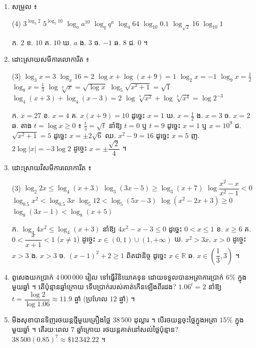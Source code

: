 \begin{enumerate}[1]
\begin{tasks}
    \task $10^{0.3010} = 2$
    \task $x^{-a} = y$
    \task $A = k^c$
  \end{tasks}
  \ans
  ក. $\log 10000 = 4$ \quad ខ. $\log_8 2 = \frac{1}{3}$ \quad គ. $\log_{16} 2 = \frac{1}{4}$ \quad ឃ. $\log_5\frac{1}{25} = -2$ \quad ង. $\log_4\frac{1}{64} = -3$ \quad ច. $\log 2 = 0.3010$ \quad ឆ. $\log_x y = -a$ \quad ជ. $\log_k A = c$ ។
  \item សម្រួល ៖
  \begin{tasks}(4)
    \task $3^{\log_3 2}$
    \task $5^{\log_5 10}$
    \task $\log_a a^{10}$
    \task $\log_q q^a$
    \task $\log_4 64$
    \task $\log_{10} 0.1$
    \task $\log_{\sqrt{2}} 16$
    \task $\log_{10} 1$
  \end{tasks}
  \ans
  ក. $2$ \quad ខ. $10$ \quad គ. $10$ \quad ឃ. $a$ \quad ង. $3$ \quad ច. $-1$ \quad ឆ. $8$ \quad ជ. $0$ ។
  \item ដោះស្រាយសមីការលោការីត ៖
  \begin{tasks}(3)
    \task $\log_3 x = 3$
    \task $\log_x 16 = 2$
    \task $\log x + \log(x + 9) = 1$
    \task $\log_2 x = -1$
    \task $\log_9 x = \frac{1}{2}$
    \task $\log_8 x = \frac{1}{3}$
    \task $\log\sqrt[3]{x} = \sqrt{\log x}$
    \task $\log_5\sqrt{x^2 + 1} = \sqrt{1}$
    \task $\log_4(x + 3) + \log_4(x - 3) = 2$
    \task $\log\sqrt[3]{x^2} + \log\sqrt[3]{x^4} = \log 2^{-3}$
  \end{tasks}
  \ans
  ក. $x = 27$ \quad ខ. $x = 4$ \quad គ. $x(x + 9) = 10$ ដូច្នេះ $x = 1$ \quad ឃ. $x = \frac{1}{2}$ \quad ង. $x = 3$ \quad ច. $x = 2$ \quad ឆ. តាង $t = \log x \ge 0$ ៖ $\frac{t}{3} = \sqrt{t}$ នាំឱ្យ $t = 0$ ឬ $t = 9$ ដូច្នេះ $x = 1$ ឬ $x = 10^9$ \quad ជ. $\sqrt{x^2 + 1} = 5$ ដូច្នេះ $x = \pm 2\sqrt{6}$ \quad ឈ. $x^2 - 9 = 16$ ដូច្នេះ $x = 5$ \quad ញ. $2\log|x| = -3\log 2$ ដូច្នេះ $x = \pm\dfrac{\sqrt{2}}{4}$ ។
  \item ដោះស្រាយវិសមីការលោការីត ៖
  \begin{tasks}(3)
    \task $\log_2 2x \le \log_4(x + 3)$
    \task $\log_3(3x - 5) \ge \log_3(x + 7)$
    \task $\log\dfrac{x^2 - x}{x^2 - 1} < 0$
    \task $\log_{0.5} x^2 < \log_{0.5} 3x$
    \task $\log_5 12 < \log_5(5x - 3)$
    \task $\log(x^2 - 2x + 3) \ge 0$
    \task $\log_8(3x - 1) < \log_8(x + 5)$
  \end{tasks}
  \ans
  ក. $\log_4 4x^2 \le \log_4(x + 3)$ នាំឱ្យ $4x^2 - x - 3 \le 0$ ដូច្នេះ $0 < x \le 1$ \quad ខ. $x \ge 6$ \quad គ. $0 < \dfrac{x}{x + 1} < 1$ ($x \ne 1$) ដូច្នេះ $x \in (0, 1) \cup (1, +\infty)$ \quad ឃ. $x^2 > 3x$, $x > 0$ ដូច្នេះ $x > 3$ \quad ង. $x > 3$ \quad ច. $(x - 1)^2 + 2 \ge 1$ ពិតជានិច្ច ដូច្នេះ $x \in \mathbb{R}$ \quad ឆ. $x \in \left(\dfrac{1}{3}, 3\right)$ ។
  \item ពូសេងយកប្រាក់ $4\,000\,000$ រៀល ទៅធ្វើវិនិយោគទុន ដោយទទួលបានអត្រាការប្រាក់ $6\%$ ក្នុងមួយឆ្នាំ ។ តើប៉ុន្មានឆ្នាំក្រោយ ទើបប្រាក់របស់គាត់កើនឡើងពីរដង?
  \ans
  $1.06^t = 2$ នាំឱ្យ $t = \dfrac{\log 2}{\log 1.06} \approx 11.9$ ឆ្នាំ (ប្រហែល $12$ ឆ្នាំ) ។
  \item មីងសុខាបានទិញរថយន្តថ្មីមួយគ្រឿងថ្លៃ $38\,500$ ដុល្លារ ។ បើរថយន្តចុះថ្លៃក្នុងអត្រា $15\%$ ក្នុងមួយឆ្នាំ ។ តើរយៈពេល $7$ ឆ្នាំក្រោយ រថយន្តគាត់នៅសល់ថ្លៃប៉ុន្មាន?
  \ans
  $38\,500(0.85)^7 \approx \$12\,342.22$ ។
\end{enumerate}
